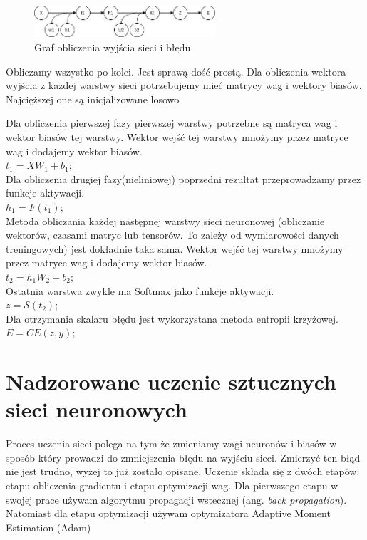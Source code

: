 \documentclass{article}
\begin{document}
\begin{figure}[H]
	\centering
	\includegraphics[width=0.6\textwidth,keepaspectratio=true]{feed_forward_graph}
	\caption{
		Graf obliczenia wyjścia sieci i błędu  
	}
	\label{feed_forward_graph}
\end{figure}


Obliczamy wszystko po kolei. Jest sprawą dość prostą. Dla obliczenia wektora wyjścia z każdej warstwy sieci potrzebujemy mieć matrycy wag i wektory biasów. Najcięższej one są inicjalizowane losowo

\begin{flushleft}
Dla obliczenia pierwszej fazy pierwszej warstwy potrzebne są matryca wag i wektor biasów tej warstwy. Wektor wejść tej warstwy mnożymy przez matryce wag i dodajemy wektor biasów.\\
$t_1 = XW_1 + b_1;$\\

Dla obliczenia drugiej fazy(nieliniowej) poprzedni rezultat przeprowadzamy przez funkcje aktywacji.\\
$h_1 = F(t_1);$\\

Metoda obliczania każdej następnej warstwy sieci neuronowej (obliczanie wektorów, czasami matryc lub tensorów. To zależy od wymiarowości danych treningowych) jest dokładnie taka sama. Wektor wejść tej warstwy mnożymy przez matryce wag i dodajemy wektor biasów.\\
$t_2 = h_1W_2 + b_2;$\\

Ostatnia warstwa zwykle ma Softmax jako funkcje aktywacji.\\
$z = \mathcal{S}(t_2);$\\

Dla otrzymania skalaru błędu jest wykorzystana metoda entropii krzyżowej.\\
$E = CE(z,y);$

\end{flushleft}


\section{Nadzorowane uczenie sztucznych sieci neuronowych}
Proces uczenia sieci polega na tym że zmieniamy wagi neuronów i biasów w sposób który prowadzi do zmniejszenia błędu na wyjściu sieci. Zmierzyć ten błąd nie jest trudno, wyżej to już zostało opisane. Uczenie składa się z dwóch etapów: etapu obliczenia gradientu i etapu optymizacji wag. 
Dla pierwszego etapu w swojej prace używam algorytmu propagacji wstecznej (ang. \textit{back propagation}). Natomiast dla etapu optymizacji używam optymizatora Adaptive Moment Estimation (Adam)
\end{document}
